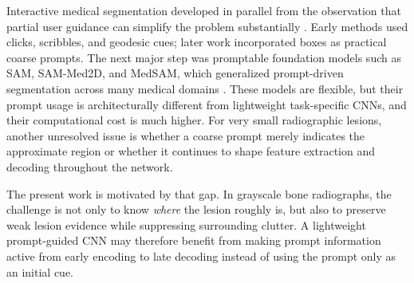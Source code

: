 \documentclass{ieeeaccess}
\begin{document}
Interactive medical segmentation developed in parallel from the observation that partial user guidance can simplify the problem substantially \cite{b5,b6}. Early methods used clicks, scribbles, and geodesic cues; later work incorporated boxes as practical coarse prompts. The next major step was promptable foundation models such as SAM, SAM-Med2D, and MedSAM, which generalized prompt-driven segmentation across many medical domains \cite{b1,b2,b9}. These models are flexible, but their prompt usage is architecturally different from lightweight task-specific CNNs, and their computational cost is much higher. For very small radiographic lesions, another unresolved issue is whether a coarse prompt merely indicates the approximate region or whether it continues to shape feature extraction and decoding throughout the network.

The present work is motivated by that gap. In grayscale bone radiographs, the challenge is not only to know \emph{where} the lesion roughly is, but also to preserve weak lesion evidence while suppressing surrounding clutter. A lightweight prompt-guided CNN may therefore benefit from making prompt information active from early encoding to late decoding instead of using the prompt only as an initial cue.
\end{document}
